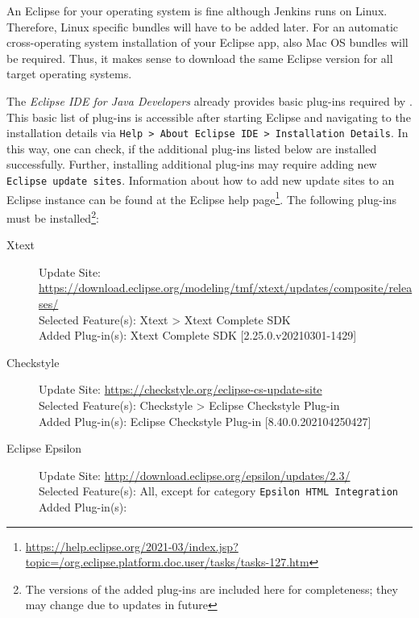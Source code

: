 \begin{description}
		An Eclipse for your operating system is fine although Jenkins runs on Linux. Therefore, Linux specific bundles will have to be added later. For an automatic cross-operating system installation of your Eclipse app, also Mac OS bundles will be required. Thus, it makes sense to download the same Eclipse version for all target operating systems.
	\item[Step 2: Install required plug-ins] $ $\\
		The \textit{Eclipse IDE for Java Developers} already provides basic plug-ins required by \EASy. This basic list of plug-ins is accessible after starting Eclipse and navigating to the installation details via \texttt{Help > About Eclipse IDE > Installation Details}. In this way, one can check, if the additional plug-ins listed below are installed successfully. Further, installing additional plug-ins may require adding new \texttt{Eclipse update sites}. Information about how to add new update sites to an Eclipse instance can be found at the Eclipse help page\footnote{\url{https://help.eclipse.org/2021-03/index.jsp?topic=/org.eclipse.platform.doc.user/tasks/tasks-127.htm}}. The following plug-ins must be installed\footnote{The versions of the added plug-ins are included here for completeness; they may change due to updates in future}:
		\begin{description}
			\item[Xtext] $ $\\
			Update Site: \url{https://download.eclipse.org/modeling/tmf/xtext/updates/composite/releases/} \\
			Selected Feature(s): Xtext > Xtext Complete SDK \\
			Added Plug-in(s): Xtext Complete SDK [2.25.0.v20210301-1429]
			\item[Checkstyle] $ $\\
			Update Site: \url{https://checkstyle.org/eclipse-cs-update-site} \\
			Selected Feature(s): Checkstyle > Eclipse Checkstyle Plug-in \\
			Added Plug-in(s): Eclipse Checkstyle Plug-in [8.40.0.202104250427]
			\item[Eclipse Epsilon] $ $\\
			Update Site: \url{http://download.eclipse.org/epsilon/updates/2.3/} \\
			Selected Feature(s): All, except for category \texttt{Epsilon HTML Integration} \\
			Added Plug-in(s):
			\begin{itemize}

\end{itemize}
\end{description}
\end{description}
